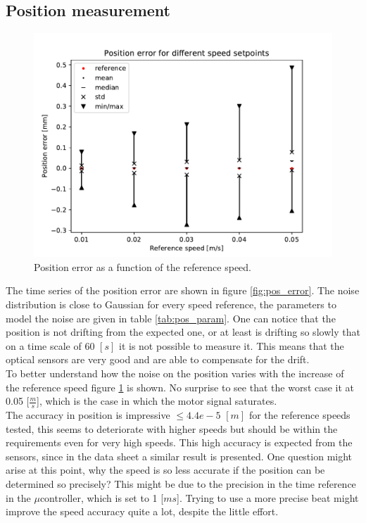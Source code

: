 \documentclass[12pt,a4paper, twoside]{article}
\begin{document}
\subsection{Position measurement}\label{sec:pos_mes}
\begin{figure}
	\centering
	\includegraphics[width=\linewidth]{fig/pos_error_comp}
	\caption{Position error as a function of the reference speed.}\label{fig:pos_error_comp}
\end{figure}
The time series of the position error are shown in figure \ref{fig:pos_error}.
The noise distribution is close to Gaussian for every speed reference, the parameters to model the noise are given in table \ref{tab:pos_param}. One can notice that the position is not drifting from the expected one, or at least is drifting so slowly that on a time scale of $60$ $[s]$ it is not possible to measure it. This means that the optical sensors are very good and are able to compensate for the drift.\\

To better understand how the noise on the position varies with the increase of the reference speed figure \ref{fig:pos_error_comp} is shown.
  No surprise to see that the worst case it at 0.05 [$\frac{m}{s}$], which is the case in which the motor signal saturates.\\
 
 The accuracy in position is impressive $\leq 4.4e-5$ $[m]$ for the reference speeds tested, this seems to deteriorate with higher speeds but should be within the requirements even for very high speeds. This high accuracy is expected from the sensors, since in the data sheet a similar result is presented.
 One question might arise at this point, why the speed is so less accurate if the position can be determined so precisely? This might be due to the precision in the time reference in the $\mu$controller, which is set to 1 [$ms$]. Trying to use a more precise beat might improve the speed accuracy quite a lot, despite the little effort.
\end{document}
